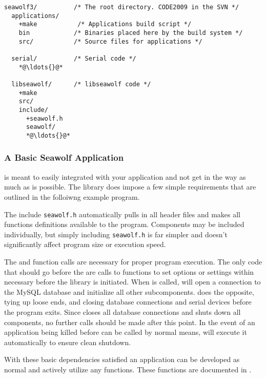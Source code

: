 \begin{lstlisting}[language=FileList, caption=Directory structure, escapeinside={{*@}{@*}}]
seawolf3/          /* The root directory. CODE2009 in the SVN */
  applications/
    +make           /* Applications build script */
    bin            /* Binaries placed here by the build system */
    src/           /* Source files for applications */
  
  serial/          /* Serial code */
    *@\ldots{}@*
 
  libseawolf/      /* libseawolf code */
    +make
    src/
    include/
      +seawolf.h
      seawolf/
      *@\ldots{}@*
\end{lstlisting}

\subsubsection{A Basic Seawolf Application} \label{environmentbasicapp}
\libseawolf{} is meant to easily integrated with your application and not get in
the way as much as is possible. The library does impose a few simple
requirements that are outlined in the folloiwng example program.



\par The include \texttt{seawolf.h} automatically pulls in all \libseawolf{}
header files and makes all functions definitions available to the
program. Components may be included individually, but simply including
\texttt{seawolf.h} is far simpler and doesn't significantly affect program size
or execution speed.

The  and
 function calls are necessary
for proper program execution. The only code that should go before the
 are calls to functions to set
options or settings within \libseawolf{} necessary before the library is
initiated. When  is called,
\libseawolf{} will open a connection to the MySQL database and initialize all
other subcomponents.  does
the opposite, tying up loose ends, and closing database connections and serial
devices before the program exits. Since
 closes all database
connections and shuts down all \libseawolf{} components, no further
\libseawolf{} calls should be made after this point. In the event of an
application being killed before
 can be called by normal
means, \libseawolf{} will execute it automatically to ensure clean shutdown.

With these basic dependencies satisfied an application can be developed as
normal and actively utilize any \libseawolf{} functions. These functions are
documented in .

